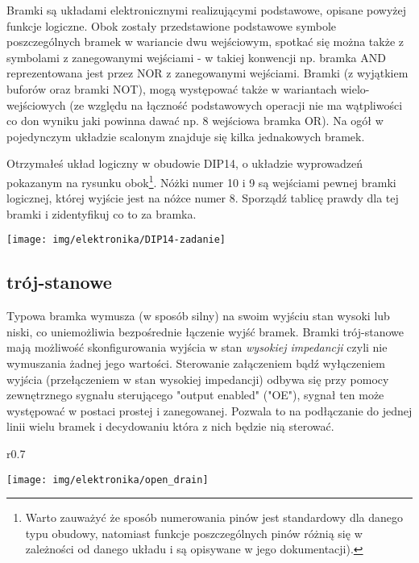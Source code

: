 \documentclass{pdfBooklets}
\begin{document}
Bramki są układami elektronicznymi realizującymi podstawowe, opisane powyżej funkcje logiczne. Obok zostały przedstawione podstawowe symbole poszczególnych bramek w wariancie dwu wejściowym, spotkać się można także z symbolami z zanegowanymi wejściami - w takiej konwencji np. bramka AND reprezentowana jest przez NOR z zanegowanymi wejściami. Bramki (z wyjątkiem buforów oraz bramki NOT), mogą występować także w wariantach wielo-wejściowych (ze względu na łączność podstawowych operacji nie ma wątpliwości co don wyniku jaki powinna dawać np. 8 wejściowa bramka OR). Na ogół w pojedynczym układzie scalonym znajduje się kilka jednakowych bramek.

\begin{Zadanie}{}{}
\noindent\begin{minipage}[t]{\textwidth}
	\noindent\parbox[b]{0.7\textwidth}{
		Otrzymałeś układ logiczny w obudowie DIP14, o układzie wyprowadzeń pokazanym na rysunku obok\footnote{
			Warto zauważyć że sposób numerowania pinów jest standardowy dla danego typu obudowy, natomiast funkcje poszczególnych pinów różnią się w zależności od danego układu i są opisywane w jego dokumentacji).
		}.
		Nóżki numer 10 i 9 są wejściami pewnej bramki logicznej, której wyjście jest na nóżce numer 8. Sporządź tablicę prawdy dla tej bramki i zidentyfikuj co to za bramka.
		\vspace{0.25cm}
	}\hfill\parbox[b]{0.25\textwidth}{
		\texttt{[image: img/elektronika/DIP14-zadanie]}
		\vspace{-0.5cm}
	}
\end{minipage}
\end{Zadanie}

\subsection{trój-stanowe}
Typowa bramka wymusza (w sposób silny) na swoim wyjściu stan wysoki lub niski, co uniemożliwia bezpośrednie łączenie wyjść bramek.
Bramki trój-stanowe mają możliwość skonfigurowania wyjścia w stan \emph{wysokiej impedancji} czyli nie wymuszania żadnej jego wartości.
Sterowanie załączeniem bądź wyłączeniem wyjścia (przełączeniem w stan wysokiej impedancji) odbywa się przy pomocy zewnętrznego sygnału sterującego "output enabled" ("OE"), sygnał ten może występować w postaci prostej i zanegowanej.
Pozwala to na podłączanie do jednej linii wielu bramek i decydowaniu która z nich będzie nią sterować.

\begin{wrapfigure}{r}{0.7\textwidth}
  \begin{center}
    \vspace{-40pt}
    \texttt{[image: img/elektronika/open\_drain]}
    \vspace{-20pt}
  \end{center}
\end{wrapfigure}
\end{document}
